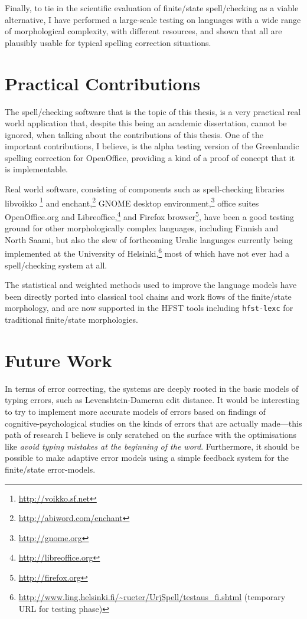 \documentclass[officiallayout,final]{unihelcompling}
\begin{document}
Finally, to tie in the scientific evaluation of finite\-/state spell\-/checking
as a viable alternative, I have performed a large-scale testing on languages
with a wide range of morphological complexity, with different resources, and
shown that all are plausibly usable for typical spelling correction situations.


\section{Practical Contributions}
\label{sec:practical-contributions}

The spell\-/checking software that is the topic of this thesis, is a very
practical real world application that, despite this being an academic
dissertation, cannot be ignored, when talking about the contributions of this
thesis. One of the important contributions, I believe, is the alpha testing
version of the Greenlandic spelling correction for OpenOffice, providing a kind
of a proof of concept that it is implementable.

Real world software, consisting of components such as spell-checking libraries
libvoikko \footnote{\url{http://voikko.sf.net}} and
enchant,\footnote{\url{http://abiword.com/enchant}} GNOME desktop
environment,\footnote{\url{http://gnome.org}} office suites OpenOffice.org and
Libreoffice,\footnote{\url{http://libreoffice.org}} and Firefox
browser\footnote{\url{http://firefox.org}}, have been a good testing ground for
other morphologically complex languages, including Finnish and North Saami, but
also the slew of forthcoming Uralic languages currently being implemented at
the University of
Helsinki,\footnote{\url{http://www.ling.helsinki.fi/~rueter/UrjSpell/testaus_fi.shtml}
(temporary URL for testing phase)} most of which have not ever had a
spell\-/checking system at all. 

The statistical and weighted methods used to improve the language models have
been directly ported into classical tool chains and work flows of the 
finite\-/state morphology, and are now supported in the HFST tools including
\texttt{hfst-lexc} for traditional finite\-/state morphologies.

\section{Future Work}
\label{sec:future-work}

In terms of error correcting, the systems are deeply rooted in the basic models
of typing errors, such as Levenshtein-Damerau edit distance. It would be
interesting to try to implement more accurate models of errors based on
findings of cognitive-psychological studies on the kinds of errors that are
actually made---this path of research I believe is only scratched on the
surface with the optimisations like \emph{avoid typing mistakes at the
beginning of the word}. Furthermore, it should be possible to make adaptive
error models using a simple feedback system for the finite\-/state
error-models.
\end{document}
